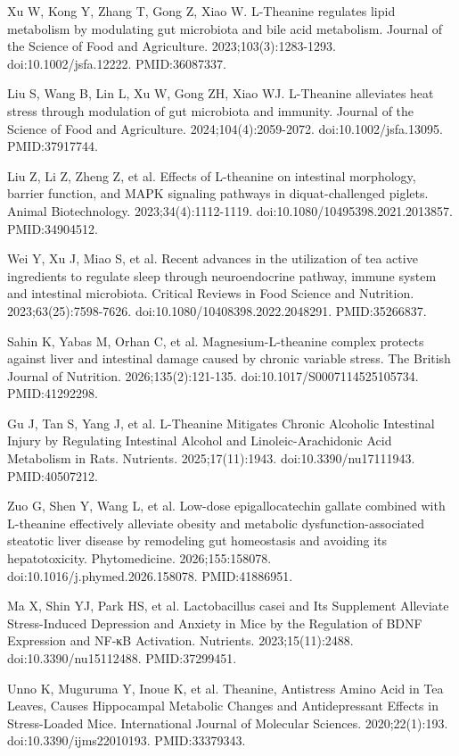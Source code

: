 \documentclass[12pt,oneside]{book}
\newcommand{\reff}[2]{\par\hangindent=7mm\hangafter=1\noindent[#1]\hspace{2mm}#2\par}
\begin{document}
\reff{19}{Xu W, Kong Y, Zhang T, Gong Z, Xiao W. L-Theanine regulates lipid metabolism by modulating gut microbiota and bile acid metabolism. Journal of the Science of Food and Agriculture. 2023;103(3):1283-1293. doi:10.1002/jsfa.12222. PMID:36087337.}

\reff{20}{Liu S, Wang B, Lin L, Xu W, Gong ZH, Xiao WJ. L-Theanine alleviates heat stress through modulation of gut microbiota and immunity. Journal of the Science of Food and Agriculture. 2024;104(4):2059-2072. doi:10.1002/jsfa.13095. PMID:37917744.}

\reff{21}{Liu Z, Li Z, Zheng Z, et al. Effects of L-theanine on intestinal morphology, barrier function, and MAPK signaling pathways in diquat-challenged piglets. Animal Biotechnology. 2023;34(4):1112-1119. doi:10.1080/10495398.2021.2013857. PMID:34904512.}

\reff{22}{Wei Y, Xu J, Miao S, et al. Recent advances in the utilization of tea active ingredients to regulate sleep through neuroendocrine pathway, immune system and intestinal microbiota. Critical Reviews in Food Science and Nutrition. 2023;63(25):7598-7626. doi:10.1080/10408398.2022.2048291. PMID:35266837.}

\reff{23}{Sahin K, Yabas M, Orhan C, et al. Magnesium-L-theanine complex protects against liver and intestinal damage caused by chronic variable stress. The British Journal of Nutrition. 2026;135(2):121-135. doi:10.1017/S0007114525105734. PMID:41292298.}

\reff{24}{Gu J, Tan S, Yang J, et al. L-Theanine Mitigates Chronic Alcoholic Intestinal Injury by Regulating Intestinal Alcohol and Linoleic-Arachidonic Acid Metabolism in Rats. Nutrients. 2025;17(11):1943. doi:10.3390/nu17111943. PMID:40507212.}

\reff{25}{Zuo G, Shen Y, Wang L, et al. Low-dose epigallocatechin gallate combined with L-theanine effectively alleviate obesity and metabolic dysfunction-associated steatotic liver disease by remodeling gut homeostasis and avoiding its hepatotoxicity. Phytomedicine. 2026;155:158078. doi:10.1016/j.phymed.2026.158078. PMID:41886951.}

\reff{26}{Ma X, Shin YJ, Park HS, et al. Lactobacillus casei and Its Supplement Alleviate Stress-Induced Depression and Anxiety in Mice by the Regulation of BDNF Expression and NF-κB Activation. Nutrients. 2023;15(11):2488. doi:10.3390/nu15112488. PMID:37299451.}

\reff{27}{Unno K, Muguruma Y, Inoue K, et al. Theanine, Antistress Amino Acid in Tea Leaves, Causes Hippocampal Metabolic Changes and Antidepressant Effects in Stress-Loaded Mice. International Journal of Molecular Sciences. 2020;22(1):193. doi:10.3390/ijms22010193. PMID:33379343.}
\end{document}
